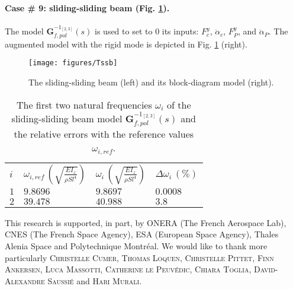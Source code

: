 \paragraph{Case \# 9: sliding-sliding beam (Fig. \ref{fig:Tss}).} The model $\mathbf{G}_{f,pol}^{-1_{[2,3]}}(s)$ is used to set to $0$ its inputs: $F^y_c$, $\ddot{\alpha}_c$, $F^y_P$, and $\ddot{\alpha}_P$. The augmented model with the rigid mode is depicted in Fig. \ref{fig:Tss} (right).
\begin{figure}[htbp!]
  \texttt{[image: figures/Tssb]}
\caption{The sliding-sliding beam (left) and its block-diagram model (right).}
\label{fig:Tss} 
\end{figure}
\begin{table}[htbp!]
\caption{The first two natural frequencies $\omega_i$ of the sliding-sliding beam model $\mathbf{G}_{f,pol}^{-1_{[2,3]}}(s)$ and the relative errors with the reference values $\omega_{i,ref}$.}
\label{tab:Tss}       %
\begin{tabular}{llll}
\hline\noalign{\smallskip}
  $i$ & $\omega_{i,ref}\,\left(\sqrt{\frac{EI_z}{\rho S l^4}}\right)$ &  $\omega_i\,\left(\sqrt{\frac{EI_z}{\rho S l^4}}\right)$ &  $\Delta \omega_i\,(\%)$ \\
\noalign{\smallskip}\hline\noalign{\smallskip}
$1$ & $9.8696$ & $9.8697$ & $0.0008$ \\ 
$2$ & $39.478$ & $40.988$ & $3.8$ \\
\hline
\end{tabular}
\end{table}

\FloatBarrier

\begin{acknowledgements}
This research is supported, in part, by ONERA (The French Aerospace Lab), CNES (The French Space Agency), ESA (European Space Agency), Thales Alenia Space and Polytechnique Montréal. We would like to thank more particularly \textsc{Christelle Cumer}, \textsc{Thomas Loquen}, \textsc{Christelle Pittet}, \textsc{Finn Ankersen}, \textsc{Luca Massotti}, \textsc{Catherine le Peuvédic}, \textsc{Chiara Toglia}, \textsc{David-Alexandre Saussié} and \textsc{Hari Murali}.
\end{acknowledgements}





